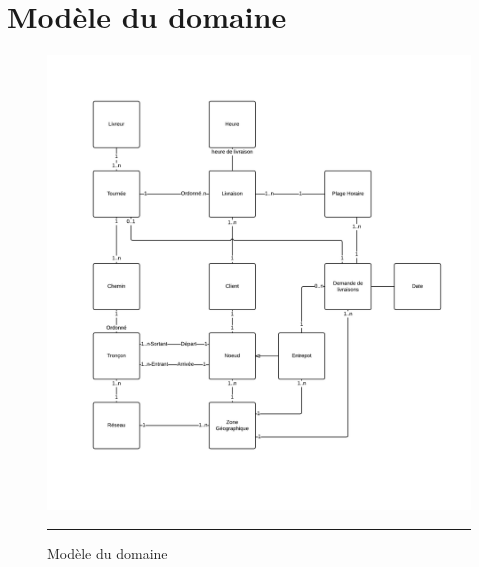 \section{Modèle du domaine}

\begin{figure}[H]
	\centering
		\includegraphics[width=\textwidth,height=\textheight,keepaspectratio]{Figures/modele_domaine}
		\rule{35em}{0.5pt}
	\caption[Modèle du domaine]{Modèle du domaine}
\end{figure}
\clearpage

